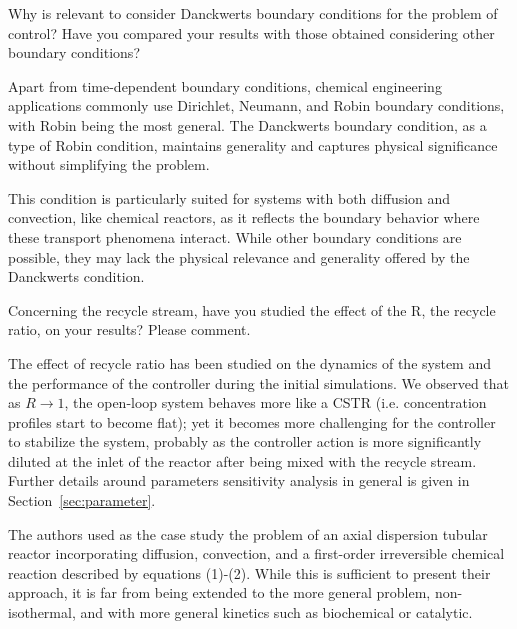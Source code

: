 \documentclass[12pt,answers]{exam}
\begin{document}
\begin{questions}

    \question Why is relevant to consider Danckwerts boundary conditions for the problem of control? Have you compared your results with those obtained considering other boundary conditions?

    \begin{solutionorbox}
        Apart from time-dependent boundary conditions, chemical engineering applications commonly use Dirichlet, Neumann, and Robin boundary conditions, with Robin being the most general. The Danckwerts boundary condition, as a type of Robin condition, maintains generality and captures physical significance without simplifying the problem.

        This condition is particularly suited for systems with both diffusion and convection, like chemical reactors, as it reflects the boundary behavior where these transport phenomena interact. While other boundary conditions are possible, they may lack the physical relevance and generality offered by the Danckwerts condition. 
    \end{solutionorbox}


    \question Concerning the recycle stream, have you studied the effect of the R, the recycle ratio, on your results? Please comment.

    \begin{solutionorbox}
        The effect of recycle ratio has been studied on the dynamics of the system and the performance of the controller during the initial simulations. We observed that as $R \rightarrow 1$, the open-loop system behaves more like a CSTR (i.e. concentration profiles start to become flat); yet it becomes more challenging for the controller to stabilize the system, probably as the controller action is more significantly diluted at the inlet of the reactor after being mixed with the recycle stream. Further details around parameters sensitivity analysis in general is given in Section~\ref{sec:parameter}. 
    \end{solutionorbox}

    
    \question The authors used as the case study the problem of an axial dispersion tubular reactor incorporating diffusion, convection, and a first-order irreversible chemical reaction described by equations (1)-(2). While this is sufficient to present their approach, it is far from being extended to the more general problem, non-isothermal, and with more general kinetics such as biochemical or catalytic.


\end{questions}
\end{document}
